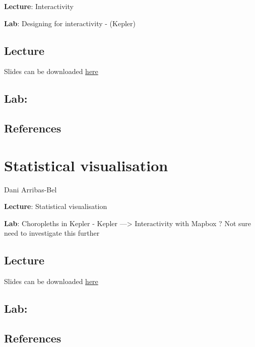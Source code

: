 \documentclass[
  letterpaper,
  DIV=11,
  numbers=noendperiod]{scrreprt}
\begin{document}
\textbf{Lecture}: Interactivity

\textbf{Lab}: Designing for interactivity - (Kepler)

\hypertarget{lecture-5}{%
\section{Lecture}\label{lecture-5}}

Slides can be downloaded
\href{https://github.com/GDSL-UL/wma/raw/main/pdf/lecture_07.pdf}{here}

\hypertarget{lab}{%
\section{Lab:}\label{lab}}

\hypertarget{references-5}{%
\section{References}\label{references-5}}


\hypertarget{statistical-visualisation}{%
\chapter{Statistical visualisation}\label{statistical-visualisation}}

Dani Arribas-Bel

\textbf{Lecture}: Statistical visualisation

\textbf{Lab}: Choropleths in Kepler - Kepler ---\textgreater{}
Interactivity with Mapbox ? Not sure need to investigate this further

\hypertarget{lecture-6}{%
\section{Lecture}\label{lecture-6}}

Slides can be downloaded
\href{https://github.com/GDSL-UL/wma/raw/main/pdf/lecture_08.pdf}{here}

\hypertarget{lab-1}{%
\section{Lab:}\label{lab-1}}

\hypertarget{references-6}{%
\section{References}\label{references-6}}
\end{document}
